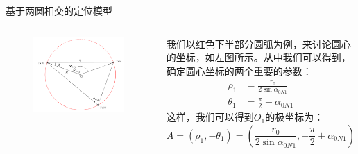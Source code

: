\documentclass[aspectratio=169]{beamer}
\begin{document}
\begin{frame}{基于两圆相交的定位模型}
    \begin{columns}
        \begin{figure}[!ht]
            \centering
            \includegraphics[width=\textwidth]{图片/问题1-1示意图 - 局部.pdf}
        \end{figure}
        我们以红色下半部分圆弧为例，来讨论圆心的坐标，如左图所示。从中我们可以得到，确定圆心坐标的两个重要的参数：
        \begin{align}
            \rho_1 &= \frac{r_0}{2\sin \alpha_{0N1}}\\
            \theta_1 &= \frac{\pi}{2} - \alpha_{0N1}
        \end{align}
        这样，我们可以得到$O_1$的极坐标为：
        \begin{equation}
            A = \left(\rho_1,-\theta_1\right) = \left(\frac{r_0}{2\sin \alpha_{0N1}}, - \frac{\pi}{2} + \alpha_{0N1}\right)
        \end{equation}
    \end{columns}
\end{frame}
\end{document}
